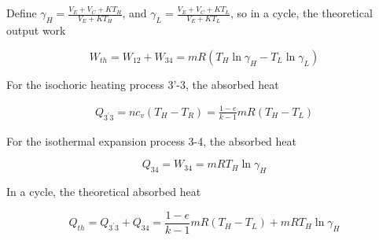 \documentclass[review,3p,10t]{elsarticle}
\begin{document}
Define $\gamma_H = \frac{V_E+V_C+KT_H}{V_E+KT_H}$, and $\gamma_L = \frac{V_E+V_C+KT_L}{V_E+KT_L}$, so in a cycle, the theoretical output work

\begin{equation}
	W_{th} = W_{12} + W_{34} = mR(T_H\ln\gamma_H - T_L\ln\gamma_L)
\end{equation}

For the isochoric heating process 3'-3, the absorbed heat

\begin{equation}
	\begin{split}
		Q_{3^{'}3} = nc_v(T_H-T_R)
		=\frac{1-e}{k-1}mR(T_H-T_L)
	\end{split}
\end{equation}


For the isothermal expansion process 3-4, the absorbed heat

\begin{equation}
	Q_{34} = W_{34} = mRT_H\ln\gamma_H
\end{equation}

In a cycle, the theoretical absorbed heat

\begin{equation}
	Q_{th} = Q_{3^{'}3} + Q_{34} = \frac{1-e}{k-1}mR(T_H-T_L) + mRT_H\ln\gamma_H
\end{equation}


%
%
\end{document}
